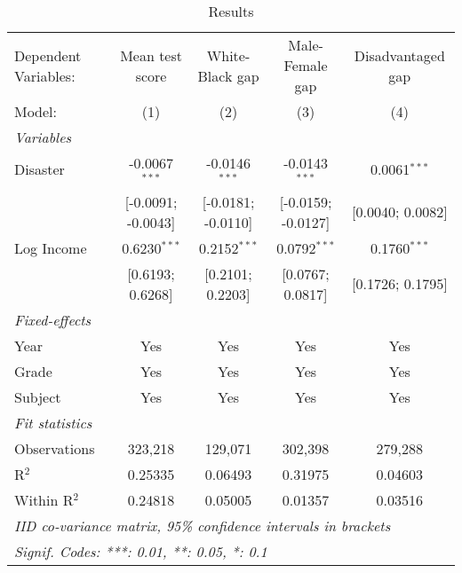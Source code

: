 
\begin{table}[htbp]
   \centering
   \caption{\label{MainResults} Results}
   \begin{tabular}{lcccc}
      \tabularnewline\midrule\midrule
      Dependent Variables: & Mean test score    & White-Black gap    & Male-Female gap    & Disadvantaged gap\\
      Model:               & (1)                & (2)                & (3)                & (4)\\
      \midrule \emph{Variables} &   &   &   &  \\
      Disaster             & -0.0067$^{***}$    & -0.0146$^{***}$    & -0.0143$^{***}$    & 0.0061$^{***}$\\
                           & [-0.0091; -0.0043] & [-0.0181; -0.0110] & [-0.0159; -0.0127] & [0.0040; 0.0082]\\
      Log Income           & 0.6230$^{***}$     & 0.2152$^{***}$     & 0.0792$^{***}$     & 0.1760$^{***}$\\
                           & [0.6193; 0.6268]   & [0.2101; 0.2203]   & [0.0767; 0.0817]   & [0.1726; 0.1795]\\
      \midrule \emph{Fixed-effects} &   &   &   &  \\
      Year                 & Yes                & Yes                & Yes                & Yes\\
      Grade                & Yes                & Yes                & Yes                & Yes\\
      Subject              & Yes                & Yes                & Yes                & Yes\\
      \midrule \emph{Fit statistics} &   &   &   &  \\
      Observations         & 323,218            & 129,071            & 302,398            & 279,288\\
      R$^2$                & 0.25335            & 0.06493            & 0.31975            & 0.04603\\
      Within R$^2$         & 0.24818            & 0.05005            & 0.01357            & 0.03516\\
      \midrule\midrule\multicolumn{5}{l}{\emph{IID co-variance matrix, 95\% confidence intervals in brackets}}\\
      \multicolumn{5}{l}{\emph{Signif. Codes: ***: 0.01, **: 0.05, *: 0.1}}\\
   \end{tabular}
\end{table}


